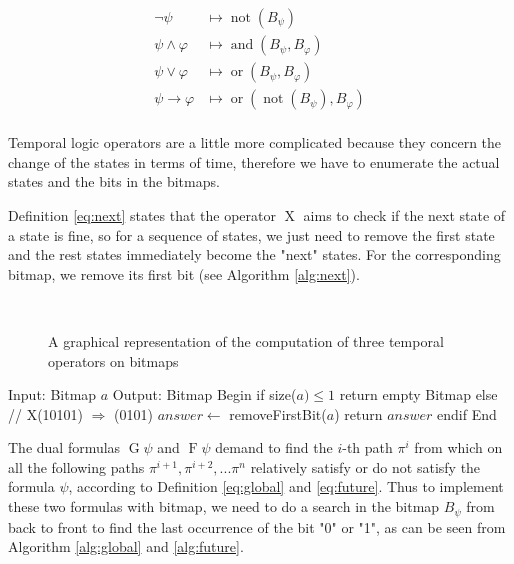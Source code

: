 \begin{align*}
\neg \psi &\mapsto \mathop{not}(B_\psi) \\
\psi \wedge \varphi &\mapsto \mathop{and}(B_\psi, B_\varphi) \\
\psi \vee \varphi &\mapsto \mathop{or}(B_\psi, B_\varphi) \\
\psi \rightarrow \varphi &\mapsto \mathop{or}(\mathop{not}(B_\psi), B_\varphi) \\
\end{align*}

Temporal logic operators are a little more complicated because they concern the change of the states in terms of time, therefore we have to enumerate the actual states and the bits in the bitmaps.

Definition \eqref{eq:next} states that the operator $\mathop{X}$ aims to check if the next state of a state is fine, so for a sequence of states, we just need to remove the first state and the rest states immediately become the "next" states. For the corresponding bitmap, we remove its first bit (see Algorithm \ref{alg:next}).

\begin{figure}
\centering
{}~~~
~~~
\caption{A graphical representation of the computation of three temporal operators on bitmaps}
\label{fig:patterns}
\end{figure}


\begin{algo}[caption=ne\textbf{\textbf{X}}t, label={alg:next}]
Input: Bitmap $a$
Output: Bitmap
Begin
  if size($a) \leq 1$
    return empty Bitmap
  else
    // X(10101) $\Rightarrow$ (0101)
    $answer \gets$ removeFirstBit($a$)
    return $answer$
  endif
End
\end{algo}

The dual formulas $\mathop{G}\psi$ and $\mathop{F}\psi$ demand to find the $i$-th path $\pi^i$ from which on all the following paths $\pi^{i + 1}, \pi^{i + 2}, ... \pi^n$ relatively satisfy or do not satisfy the formula $\psi$, according to Definition \eqref{eq:global} and \eqref{eq:future}. Thus to implement these two formulas with bitmap, we need to do a search in the bitmap $B_{\psi}$ from back to front to find the last occurrence of the bit "0" or "1", as can be seen from Algorithm \ref{alg:global} and \ref{alg:future}.

